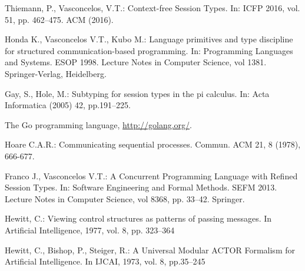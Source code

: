 
\begin{thebibliography}{8}

  Thiemann, P., Vasconcelos, V.T.: Context-free Session Types. In: ICFP 2016, vol. 51, pp. 462--475. ACM (2016). 

  Honda K., Vasconcelos V.T., Kubo M.: Language primitives and type discipline for structured communication-based programming. In: Programming Languages and Systems. ESOP 1998. Lecture Notes in Computer Science, vol 1381. Springer-Verlag, Heidelberg. 

  Gay, S., Hole, M.: Subtyping for session types in the pi calculus. In: Acta Informatica (2005)
  42, pp.191–225. 

  The Go programming language, \url{http://golang.org/}.

  Hoare C.A.R.: Communicating sequential processes. Commun. ACM 21, 8 (1978), 666-677. 
  
    Franco J., Vasconcelos V.T.: A Concurrent Programming Language with Refined Session Types. In: Software Engineering and Formal Methods. SEFM 2013. Lecture Notes in Computer Science, vol 8368, pp. 33--42. Springer. 


  
   Hewitt, C.: Viewing control structures as patterns of passing messages. In Artificial Intelligence, 1977, vol. 8, pp. 323--364

   Hewitt, C., Bishop, P., Steiger, R.: A Universal Modular ACTOR Formalism for Artificial Intelligence. In IJCAI, 1973, vol. 8, pp.35--245

  
  

\end{thebibliography}
